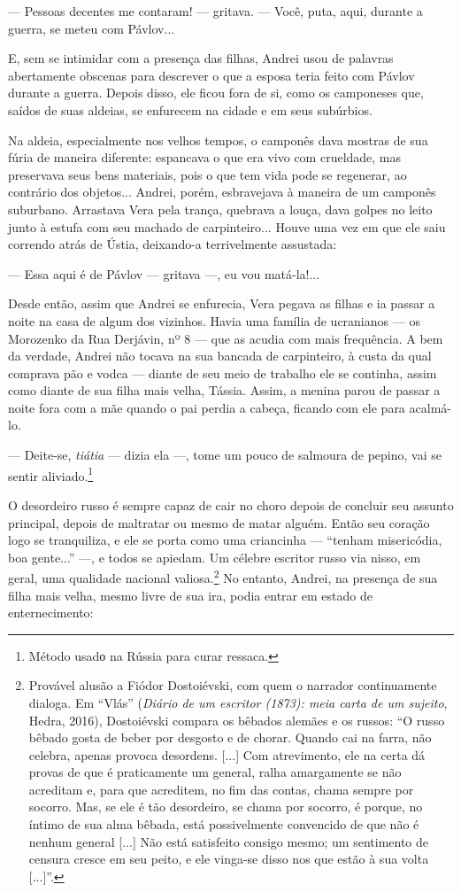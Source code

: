 --- Pessoas decentes me contaram! --- gritava. --- Você, puta, aqui,
durante a guerra, se meteu com Pávlov...

E, sem se intimidar com a presença das filhas, Andrei usou de palavras
abertamente obscenas para descrever o que a esposa teria feito com
Pávlov durante a guerra. Depois disso, ele ficou fora de si, como os
camponeses que, saídos de suas aldeias, se enfurecem na cidade e em seus
subúrbios.

Na aldeia, especialmente nos velhos tempos, o camponês dava mostras de
sua fúria de maneira diferente: espancava o que era vivo com crueldade,
mas preservava seus bens materiais, pois o que tem vida pode se
regenerar, ao contrário dos objetos... Andrei, porém, esbravejava à
maneira de um camponês suburbano. Arrastava Vera pela trança, quebrava a
louça, dava golpes no leito junto à estufa com seu machado de
carpinteiro... Houve uma vez em que ele saiu correndo atrás de Ústia,
deixando-a terrivelmente assustada:

--- Essa aqui é de Pávlov --- gritava ---, eu vou matá-la!...

Desde então, assim que Andrei se enfurecia, Vera pegava as filhas e ia
passar a noite na casa de algum dos vizinhos. Havia uma família de
ucranianos --- os Morozenko da Rua Derjávin, nº 8 --- que as acudia com
mais frequência. A bem da verdade, Andrei não tocava na sua bancada de
carpinteiro, à custa da qual comprava pão e vodca --- diante de seu meio
de trabalho ele se continha, assim como diante de sua filha mais velha,
Tássia. Assim, a menina parou de passar a noite fora com a mãe quando o
pai perdia a cabeça, ficando com ele para acalmá-lo.

--- Deite-se, \emph{tiátia} --- dizia ela ---, tome um pouco de salmoura
de pepino, vai se sentir aliviado.\footnote{Método usadо na Rússia para
  curar ressaca.}

O desordeiro russo é sempre capaz de cair no choro depois de concluir
seu assunto principal, depois de maltratar ou mesmo de matar alguém.
Então seu coração logo se tranquiliza, e ele se porta como uma
criancinha --- ``tenham misericódia, boa gente...'' ---, e todos se
apiedam. Um célebre escritor russo via nisso, em geral, uma qualidade
nacional valiosa.\footnote{Provável alusão a Fiódor Dostoiévski, com
  quem o narrador continuamente dialoga. Em ``Vlás'' (\emph{Diário de um
  escritor (1873): meia carta de um sujeito}, Hedra, 2016), Dostoiévski
  compara os bêbados alemães e os russos: ``O russo bêbado gosta de
  beber por desgosto e de chorar. Quando cai na farra, não celebra,
  apenas provoca desordens. {[}...{]} Com atrevimento, ele na certa dá
  provas de que é praticamente um general, ralha amargamente se não
  acreditam e, para que acreditem, no fim das contas, chama sempre por
  socorro. Mas, se ele é tão desordeiro, se chama por socorro, é porque,
  no íntimo de sua alma bêbada, está possivelmente convencido de que não
  é nenhum general {[}...{]} Não está satisfeito consigo mesmo; um
  sentimento de censura cresce em seu peito, e ele vinga-se disso nos
  que estão à sua volta {[}...{]}''.} No entanto, Andrei, na presença de
sua filha mais velha, mesmo livre de sua ira, podia entrar em estado de
enternecimento:

